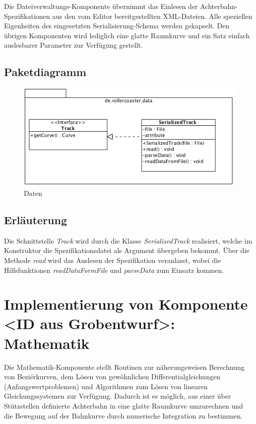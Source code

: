 Die Dateiverwaltungs-Komponente übernimmt das Einlesen der Achterbahn-Spezifikationen 
aus den vom Editor bereitgestellten XML-Dateien. Alle speziellen Eigenheiten des
eingesetzten Serialisierung-Schema werden gekapselt. Den übrigen Komponenten wird 
lediglich eine glatte Raumkurve und ein Satz einfach auslesbarer Parameter zur Verfügung
gestellt.

\subsection{Paketdiagramm}

\begin{figure}
\includegraphics[width=\linewidth]{bilder/Data}
\caption{Daten}
\end{figure}

\subsection{Erläuterung}

Die Schnittstelle \emph{Track} wird durch die Klasse \emph{SerializedTrack} realisiert,
welche im Konstruktor die Spezifikationsdatei als Argument übergeben bekommt. Über
die Methode \emph{read} wird das Auslesen der Spezifikation veranlasst, wobei
die Hilfsfunktionen \emph{readDataFormFile} und \emph{parseData} zum Einsatz kommen.

\section{Implementierung von Komponente
         <ID aus Grobentwurf>: Mathematik}

Die Mathematik-Komponente stellt Routinen zur näherungsweisen Berechnung
von Beziérkurven, dem Lösen von gewöhnlichen Differentialgleichungen 
(Anfangswertproblemen) und Algorithmen zum Lösen von linearen Gleichungssystemen
zur Verfügung. Dadurch ist es möglich, aus einer über Stützstellen definierte 
Achterbahn in eine glatte Raumkurve umzurechnen und die Bewegung auf
der Bahnkurve durch numerische Integration zu bestimmen.

